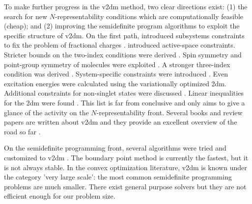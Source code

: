 To make further progress in the \gls{v2dm} method, two clear directions exist: (1) the search for new $N$-representability conditions which
are computationally feasible (cheap); and (2) improving the semidefinite program algorithms to exploit the specific structure of \gls{v2dm}. 
On the first path,  introduced subsystems constraints to fix the problem of fractional charges \citep{helen_1}. 
introduced active-space constraints. Stricter bounds on the two-index conditions were derived \citep{dimi,55Johnson_2013a}. Spin symmetry
and point-group symmetry of molecules were exploited \citep{maz_spin}. A stronger three-index condition was derived \citep{maz_T2_prime}.
System-specific constraints were introduced \citep{maz_ham,218Verstichel_2012}. Even excitation energies were calculated
\citep{12Aggelen_2013} using the variationally optimized \gls{2dm}. Additional constraints for non-singlet states were discussed
\citep{128Aggelen_2012}. Linear inequalities for the \gls{2dm} were found \citep{davidson_3,davidson_2,davidson_1}. This list is far from
conclusive and only aims to give a glance of the activity on the $N$-representability front.
Several books and review papers are written about \gls{v2dm} and they provide an excellent overview of the road so far
\citep{coleman_book,rdm_book,mazz_book,braams_book,maz_review,Ayers20131}.

On the semidefinite programming front, several algorithms were tried and customized to \gls{v2dm}
\citep{cpc_proc,maz_prl,primal_dual,mazziotti_large-scale_2011}. The boundary point method \citep{maz_bp} is currently the fastest, but it
is not always stable. In the convex optimization literature, \gls{v2dm} is known under the category 'very large scale': the most common
semidefinite programming problems are much smaller. There exist general purpose solvers \citep{sdpa1} but they are not efficient enough for
our problem size.

 


